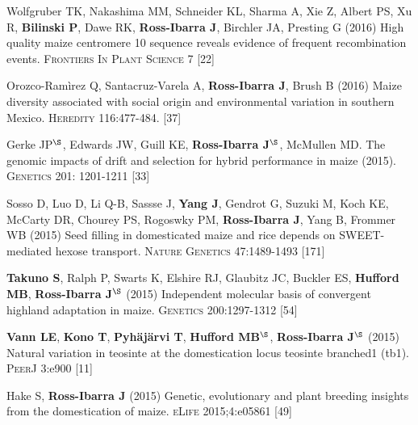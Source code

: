 \documentclass[letterpaper,10pt]{article}
\begin{document}
\begin{etaremune}
\item Wolfgruber TK, Nakashima MM, Schneider KL, Sharma A, Xie Z, Albert PS, Xu R, {\bf Bilinski P},  Dawe RK, {\bf Ross-Ibarra J}, Birchler JA, Presting G (2016) High quality maize centromere 10 sequence reveals evidence of frequent recombination events. \textsc{Frontiers In Plant Science} 7
 [22]\\

\item Orozco-Ram\`{i}rez Q, Santacruz-Varela A, {\bf Ross-Ibarra J}, Brush B (2016) Maize diversity associated with social origin and environmental variation in southern Mexico. \textsc{Heredity} 116:477-484.
 [37]\\


\item Gerke JP$^\S$, Edwards JW, Guill KE, {\bf Ross-Ibarra J}$^\S$, McMullen MD.  The genomic impacts of drift and selection for hybrid performance in maize (2015). \textsc{Genetics}  201: 1201-1211
 [33]\\


\item Sosso D, Luo D, Li Q-B, Sassse J, {\bf Yang J}, Gendrot G, Suzuki M, Koch KE, McCarty DR, Chourey PS, Rogoswky PM, {\bf Ross-Ibarra J}, Yang B, Frommer WB (2015) Seed filling in domesticated maize and rice depends on SWEET-mediated hexose transport. \textsc{Nature Genetics} 47:1489-1493
 [171]\\


\item {\bf Takuno S}, Ralph P, Swarts K, Elshire RJ, Glaubitz JC, Buckler ES, {\bf Hufford MB}, {\bf Ross-Ibarra J}$^\S$ (2015) Independent molecular basis of convergent highland adaptation in maize. \textsc{Genetics} 200:1297-1312
 [54]\\


\item {\bf Vann LE}, {\bf Kono T}, {\bf Pyh\"aj\"arvi T}, {\bf Hufford MB}$^\S$, {\bf Ross-Ibarra J}$^\S$ (2015) Natural variation in teosinte at the domestication locus teosinte branched1 (tb1). \textsc{PeerJ} 3:e900
 [11]\\


\item Hake S, {\bf Ross-Ibarra J} (2015) Genetic, evolutionary and plant breeding insights from the domestication of maize. \textsc{eLife}  2015;4:e05861
 [49]\\



\end{etaremune}
\end{document}
